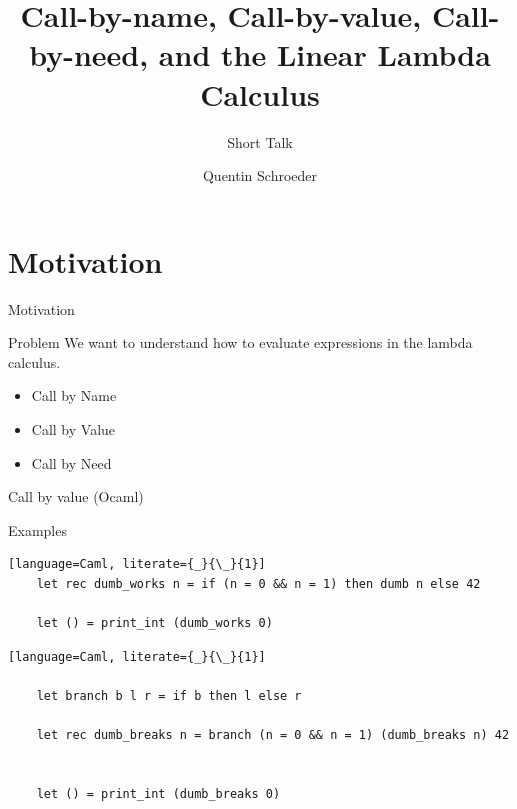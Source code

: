 \documentclass[10pt]{beamer}
\title{Call-by-name, Call-by-value, Call-by-need, and the Linear Lambda Calculus}
\subtitle{Short Talk}
\date{}
\author{Quentin Schroeder}
\institute{MPRI - Université Paris-Cité}
\begin{document}
\maketitle


\section[Idea]{Motivation}



\begin{frame}[fragile]{Motivation}
  \begin{alertblock}{Problem}
    We want to understand how to evaluate expressions in the lambda calculus.\\
  \end{alertblock}

  \begin{itemize} [<+- | alert@+>]
    \item Call by Name
    \item Call by Value
    \item Call by Need
  \end{itemize}
\end{frame}


\begin{frame}[fragile]{Call by value (Ocaml)}
  \begin{alertblock}{Examples}
  \begin{lstlisting}[language=Caml, literate={_}{\_}{1}]
    let rec dumb_works n = if (n = 0 && n = 1) then dumb n else 42

    let () = print_int (dumb_works 0)

  \end{lstlisting}
  \pause
  \begin{lstlisting}[language=Caml, literate={_}{\_}{1}]

    let branch b l r = if b then l else r

    let rec dumb_breaks n = branch (n = 0 && n = 1) (dumb_breaks n) 42


    let () = print_int (dumb_breaks 0)

  \end{lstlisting}
  \end{alertblock}
\end{frame}
\end{document}
